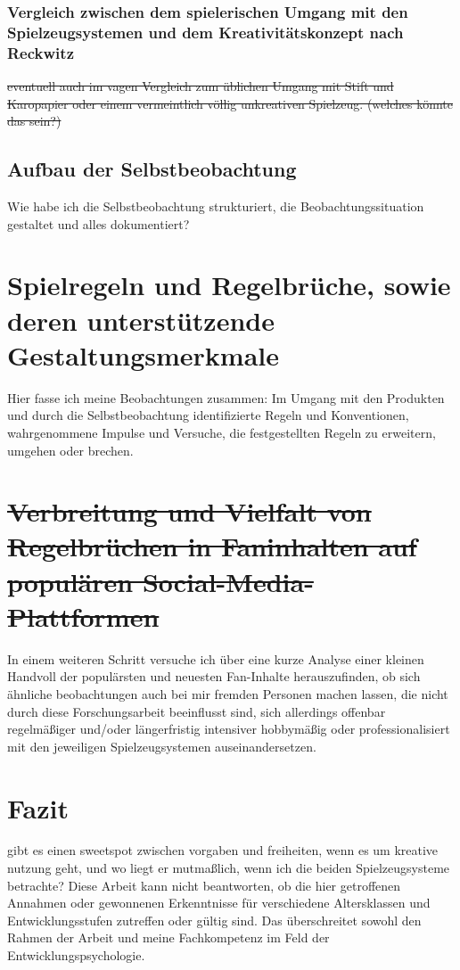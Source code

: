 \documentclass[11pt,a4paper,twoside]{scrreprt}
\begin{document}
		\subsection{Vergleich zwischen dem spielerischen Umgang mit den Spielzeugsystemen und dem Kreativitätskonzept nach Reckwitz}
		\sout{eventuell auch im vagen Vergleich zum üblichen Umgang mit Stift und Karopapier oder einem vermeintlich völlig unkreativen Spielzeug. (welches könnte das sein?)}
	\section{Aufbau der Selbstbeobachtung}
Wie habe ich die Selbstbeobachtung strukturiert, die Beobachtungssituation gestaltet und alles dokumentiert?


\chapter{Spielregeln und Regelbrüche, sowie deren unterstützende Gestaltungsmerkmale}
Hier fasse ich meine Beobachtungen zusammen: Im Umgang mit den Produkten und durch die Selbstbeobachtung identifizierte Regeln und Konventionen, wahrgenommene Impulse und Versuche, die festgestellten Regeln zu erweitern, umgehen oder brechen.


\chapter{\sout{Verbreitung und Vielfalt von Regelbrüchen in Faninhalten auf populären Social-Media-Plattformen}}
In einem weiteren Schritt versuche ich über eine kurze Analyse einer kleinen Handvoll der populärsten und neuesten Fan-Inhalte herauszufinden, ob sich ähnliche beobachtungen auch bei mir fremden Personen machen lassen, die nicht durch diese Forschungsarbeit beeinflusst sind, sich allerdings offenbar regelmäßiger und/oder längerfristig intensiver hobbymäßig oder professionalisiert mit den jeweiligen Spielzeugsystemen auseinandersetzen.


\chapter{Fazit}
gibt es einen sweetspot zwischen vorgaben und freiheiten, wenn es um kreative nutzung geht, und wo liegt er mutmaßlich, wenn ich die beiden Spielzeugsysteme betrachte? Diese Arbeit kann nicht beantworten, ob die hier getroffenen Annahmen oder gewonnenen Erkenntnisse für verschiedene Altersklassen und Entwicklungsstufen zutreffen oder gültig sind. Das überschreitet sowohl den Rahmen der Arbeit und meine Fachkompetenz im Feld der Entwicklungspsychologie.
\end{document}
